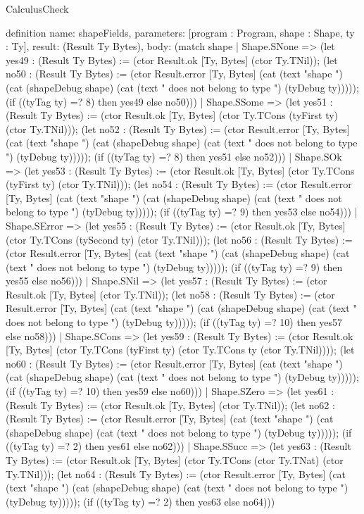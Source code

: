 \begin{lexlean}{CalculusCheck}
\begin{semanticmodule}
definition{
  name: shapeFields,
  parameters: [program : Program, shape : Shape, ty : Ty],
  result: (Result Ty Bytes),
  body: (match shape
    | Shape.SNone => (let yes49 : (Result Ty Bytes) := (ctor Result.ok [Ty, Bytes] (ctor Ty.TNil)); (let no50 : (Result Ty Bytes) := (ctor Result.error [Ty, Bytes] (cat (text "shape ") (cat (shapeDebug shape) (cat (text " does not belong to type ") (tyDebug ty))))); (if ((tyTag ty) =? 8) then yes49 else no50)))
    | Shape.SSome => (let yes51 : (Result Ty Bytes) := (ctor Result.ok [Ty, Bytes] (ctor Ty.TCons (tyFirst ty) (ctor Ty.TNil))); (let no52 : (Result Ty Bytes) := (ctor Result.error [Ty, Bytes] (cat (text "shape ") (cat (shapeDebug shape) (cat (text " does not belong to type ") (tyDebug ty))))); (if ((tyTag ty) =? 8) then yes51 else no52)))
    | Shape.SOk => (let yes53 : (Result Ty Bytes) := (ctor Result.ok [Ty, Bytes] (ctor Ty.TCons (tyFirst ty) (ctor Ty.TNil))); (let no54 : (Result Ty Bytes) := (ctor Result.error [Ty, Bytes] (cat (text "shape ") (cat (shapeDebug shape) (cat (text " does not belong to type ") (tyDebug ty))))); (if ((tyTag ty) =? 9) then yes53 else no54)))
    | Shape.SError => (let yes55 : (Result Ty Bytes) := (ctor Result.ok [Ty, Bytes] (ctor Ty.TCons (tySecond ty) (ctor Ty.TNil))); (let no56 : (Result Ty Bytes) := (ctor Result.error [Ty, Bytes] (cat (text "shape ") (cat (shapeDebug shape) (cat (text " does not belong to type ") (tyDebug ty))))); (if ((tyTag ty) =? 9) then yes55 else no56)))
    | Shape.SNil => (let yes57 : (Result Ty Bytes) := (ctor Result.ok [Ty, Bytes] (ctor Ty.TNil)); (let no58 : (Result Ty Bytes) := (ctor Result.error [Ty, Bytes] (cat (text "shape ") (cat (shapeDebug shape) (cat (text " does not belong to type ") (tyDebug ty))))); (if ((tyTag ty) =? 10) then yes57 else no58)))
    | Shape.SCons => (let yes59 : (Result Ty Bytes) := (ctor Result.ok [Ty, Bytes] (ctor Ty.TCons (tyFirst ty) (ctor Ty.TCons ty (ctor Ty.TNil)))); (let no60 : (Result Ty Bytes) := (ctor Result.error [Ty, Bytes] (cat (text "shape ") (cat (shapeDebug shape) (cat (text " does not belong to type ") (tyDebug ty))))); (if ((tyTag ty) =? 10) then yes59 else no60)))
    | Shape.SZero => (let yes61 : (Result Ty Bytes) := (ctor Result.ok [Ty, Bytes] (ctor Ty.TNil)); (let no62 : (Result Ty Bytes) := (ctor Result.error [Ty, Bytes] (cat (text "shape ") (cat (shapeDebug shape) (cat (text " does not belong to type ") (tyDebug ty))))); (if ((tyTag ty) =? 2) then yes61 else no62)))
    | Shape.SSucc => (let yes63 : (Result Ty Bytes) := (ctor Result.ok [Ty, Bytes] (ctor Ty.TCons (ctor Ty.TNat) (ctor Ty.TNil))); (let no64 : (Result Ty Bytes) := (ctor Result.error [Ty, Bytes] (cat (text "shape ") (cat (shapeDebug shape) (cat (text " does not belong to type ") (tyDebug ty))))); (if ((tyTag ty) =? 2) then yes63 else no64)))
}
\end{semanticmodule}
\end{lexlean}
